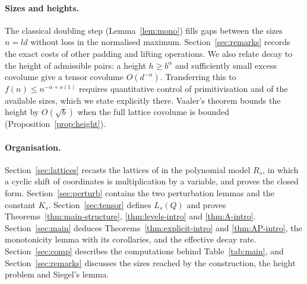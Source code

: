 \documentclass[12pt]{article}
\begin{document}
\paragraph{Sizes and heights.} The classical doubling step (Lemma~\ref{lem:mono}) fills gaps between the sizes $n=ld$
without loss in the normalised maximum. Section~\ref{sec:remarks} records the exact costs of other padding and lifting
operations. We also relate decay to the height of admissible pairs: a height $h\ge b^\alpha$ and sufficiently small
excess covolume give a tensor covolume $O(d^{-\alpha})$. Transferring this to $f(n)\le n^{-\alpha+o(1)}$ requires
quantitative control of primitivisation and of the available sizes, which we state explicitly there. Vaaler's theorem
bounds the height by $O(\sqrt b)$ when the full lattice covolume is bounded (Proposition~\ref{prop:height}).

\paragraph{Organisation.} Section~\ref{sec:lattices} recasts the lattices of \cite{EP1} in the polynomial model $R_s$,
in which a cyclic shift of coordinates is multiplication by a variable, and proves the closed form.
Section~\ref{sec:perturb} contains the two perturbation lemmas and the constant $K_s$. Section~\ref{sec:tensor} defines
$L_s(Q)$ and proves Theorems~\ref{thm:main-structure}, \ref{thm:levels-intro} and \ref{thm:A-intro}.
Section~\ref{sec:main} deduces Theorems~\ref{thm:explicit-intro} and \ref{thm:AP-intro}, the monotonicity lemma with its
corollaries, and the effective decay rate. Section~\ref{sec:comp} describes the computations behind Table~\ref{tab:main}, and
Section~\ref{sec:remarks} discusses the sizes reached by the construction, the height problem and Siegel's lemma.
\end{document}
